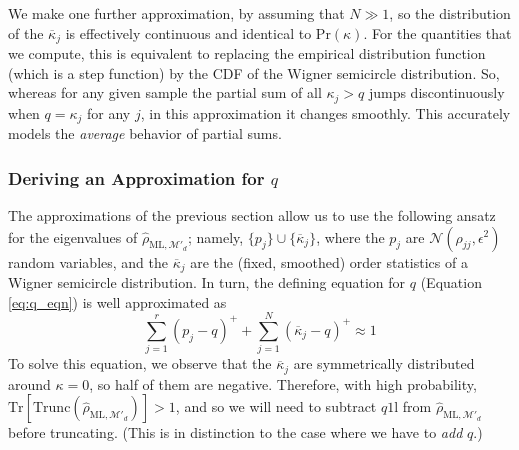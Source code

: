 \documentclass[aps,pra, twocolumn]{revtex4-1}
\newcommand{\M}{\mathcal{M}}
\newcommand{\Tr}{\mathrm{Tr}}
\newcommand{\Id}{\mathbb{I}}
\def\Id{1\!\mathrm{l}}
\newcommand{\rhohat}{\hat{\rho}}
\newcommand{\rhoML}[1]{\rhohat_{\scriptscriptstyle{\mathrm{ML},#1}}}
\begin{document}
We make one further approximation, by assuming that $N\gg1$, so the distribution of the $\overline{\kappa}_j$ is effectively continuous and identical to $\mathrm{Pr}(\kappa)$. For the quantities that we compute, this is equivalent to replacing the empirical distribution function (which is a step function) by the CDF of the Wigner semicircle distribution.  So, whereas for any given sample the partial sum of all $\kappa_j > q$ jumps discontinuously when $q=\kappa_j$ for any $j$, in this approximation it changes smoothly.  This accurately models the \emph{average} behavior of partial sums.

\subsubsection{Deriving an Approximation for $q$}
The approximations of the previous section allow us to use the following ansatz for the eigenvalues of $\rhoML{\M'_{d}}$; namely, $\{p_j\} \cup \{\overline{\kappa}_j\}$, where the $p_j$ are $\mathcal{N}(\rho_{jj},\epsilon^2)$ random variables, and the $\overline{\kappa}_j$ are the (fixed, smoothed) order statistics of a Wigner semicircle distribution.  In turn, the defining equation for $q$ (Equation \eqref{eq:q_eqn}) is well approximated as
\begin{equation}
\sum_{j=1}^{r}(p_j - q)^{+} + \sum_{j=1}^{N}{(\overline{\kappa}_j-q)^+} \approx 1
\end{equation}
To solve this equation, we observe that the $\overline{\kappa}_j$ are symmetrically distributed around $
\kappa=0$, so half of them are negative.  Therefore, with high probability, $\Tr
\left[\mathrm{Trunc}(\rhoML{\M'_{d}})\right]>1$, and so we will need to subtract $q\Id$ from $\rhoML{\M'_{d}}$ before truncating. (This is in distinction to the case where we have to \emph{add} $q$.)
\end{document}
